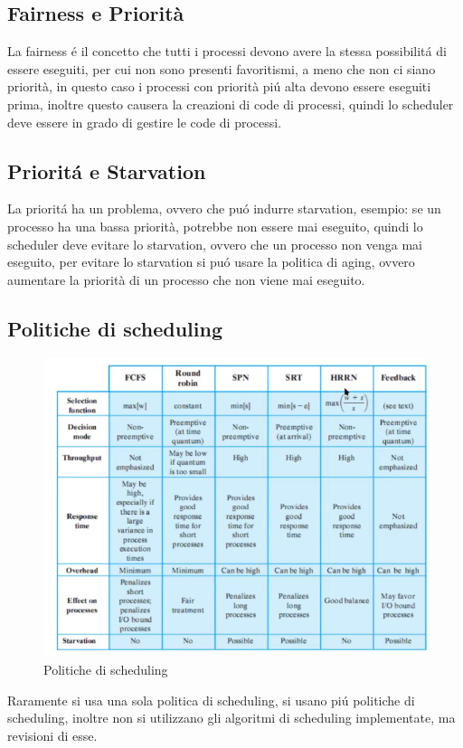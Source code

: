 \documentclass[11pt]{article}
\begin{document}
    \subsection{Fairness e Priorità}
    La fairness é il concetto che tutti i processi devono avere la stessa possibilitá di essere eseguiti, per cui non sono
    presenti favoritismi, a meno che non ci siano priorità, in questo caso i processi con priorità piú alta devono essere eseguiti
    prima, inoltre questo causera la creazioni di code di processi, quindi lo scheduler deve essere in grado di gestire le code
    di processi.
    \subsection{Prioritá e Starvation}
    La prioritá ha un problema, ovvero che puó indurre starvation, esempio: se un processo ha una bassa priorità, potrebbe
    non essere mai eseguito, quindi lo scheduler deve evitare lo starvation, ovvero che un processo non venga mai eseguito,
    per evitare lo starvation si puó usare la politica di aging, ovvero aumentare la priorità di un processo che non viene mai eseguito.
    \subsection{Politiche di scheduling}
    \begin{figure}[H]
        \centering
        \includegraphics[width=1\textwidth]{immagini/PoliticheDiScheduling}
        \caption{Politiche di scheduling}
    \end{figure}
    Raramente si usa una sola politica di scheduling, si usano piú politiche di scheduling, inoltre non si
    utilizzano gli algoritmi di scheduling implementate, ma revisioni di esse.
\end{document}
